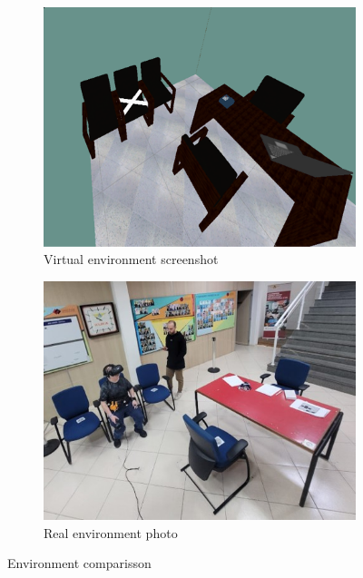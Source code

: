 \begin{figure}[!htb]
    \centering
    \begin{subfigure}[b]{0.49\textwidth}
        \centering
        \includegraphics[width=\textwidth]{Metodologia/VE.png}
        \caption{Virtual environment screenshot}
        \label{fig:ve_photo}
    \end{subfigure}
    \hfill
    \begin{subfigure}[b]{0.49\textwidth}
        \centering
        \includegraphics[width=\textwidth]{Metodologia/RE.jpg}
        \caption{Real environment photo}
        \label{fig:re_photo}
    \end{subfigure}
       \caption{Environment comparisson}
       \label{fig:ve_re}
\end{figure}